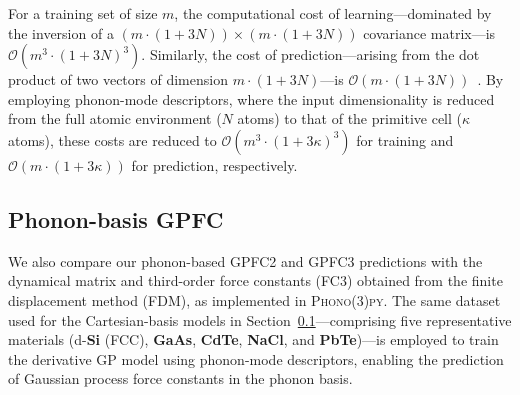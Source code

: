 For a training set of size \( m \), the computational cost of learning—dominated by the inversion of a \( (m \cdot (1 + 3N)) \times (m \cdot (1 + 3N)) \) covariance matrix—is \( \mathcal{O}(m^{3} \cdot (1 + 3N)^{3}) \). Similarly, the cost of prediction—arising from the dot product of two vectors of dimension \( m \cdot (1 + 3N) \)—is \( \mathcal{O}(m \cdot (1 + 3N)) \)~\cite{RasmussenW06, David}. By employing phonon-mode descriptors, where the input dimensionality is reduced from the full atomic environment (\( N \) atoms) to that of the primitive cell (\( \kappa \) atoms), these costs are reduced to \( \mathcal{O}(m^{3} \cdot (1 + 3\kappa)^{3}) \) for training and \( \mathcal{O}(m \cdot (1 + 3\kappa)) \) for prediction, respectively.

\subsection{Phonon-basis GPFC} \label{subsec:3.2.2}
We also compare our phonon-based GPFC2 and GPFC3 predictions with the dynamical matrix and third-order force constants (FC3) obtained from the finite displacement method (FDM), as implemented in \textsc{Phono(3)py}. The same dataset used for the Cartesian-basis models in Section~\ref{subsec:3.2.2}—comprising five representative materials (d-\textbf{Si} (FCC), \textbf{GaAs}, \textbf{CdTe}, \textbf{NaCl}, and \textbf{PbTe})—is employed to train the derivative GP model using phonon-mode descriptors, enabling the prediction of Gaussian process force constants in the phonon basis.


